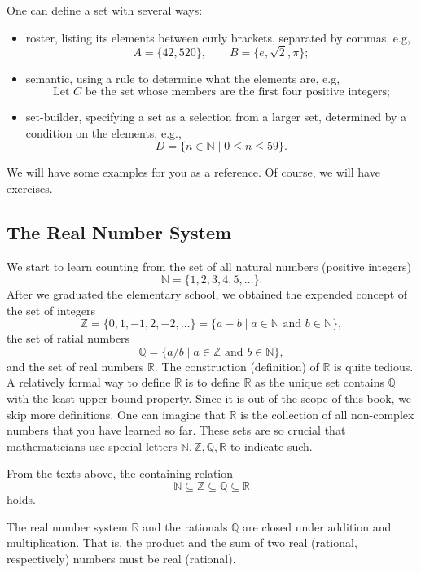 \documentclass[11pt]{book}
\theoremstyle{break}
\theoremstyle{no_label}
\newcommand{\bbR}{\mathbb{R}}
\newcommand{\bbN}{\mathbb{N}}
\numberwithin{equation}{section}
\begin{document}
One can define a set with several ways:
\begin{itemize}
    \item roster, listing its elements between curly brackets, separated by commas, e.g, $$A=\{42, 520\}, \qquad B=\{e, \sqrt{2}, \pi\};$$
    \item semantic, using a rule to determine what the elements are, e.g, $$\text{Let $C$ be the set whose members are the first four positive integers;}$$
    \item set-builder, specifying a set as a selection from a larger set, determined by a condition on the elements, e.g., $$D=\{n\in\bbN\mid 0\leq n\leq 59\}.$$
\end{itemize}

We will have some examples for you as a reference. Of course, we will have exercises.

\subsection*{The Real Number System}

We start to learn counting from the set of all natural numbers (positive integers) $$\bbN=\{1, 2, 3, 4, 5, \dots\}.$$ After we graduated the elementary school, we obtained the expended concept of the set of integers $$\mathbb{Z}=\{0, 1, -1, 2, -2, \dots\}=\{a - b\mid a\in\bbN\text{\ and \ }b\in\bbN\},$$ the set of ratial numbers $$\mathbb{Q}=\{a/b\mid a\in\mathbb{Z}\text{\ and\ }b\in\bbN\},$$ and the set of real numbers $\bbR$. The construction (definition) of $\bbR$ is quite tedious. A relatively formal way to define $\bbR$ is to define $\bbR$ as the unique set contains $\mathbb{Q}$ with the least upper bound property. Since it is out of the scope of this book, we skip more definitions. One can imagine that $\bbR$ is the collection of all non-complex numbers that you have learned so far. These sets are so crucial that mathematicians use special letters $\mathbb{N}, \mathbb{Z}, \mathbb{Q}, \bbR$ to indicate such.

\begin{corollary}
    From the texts above, the containing relation $$\bbN\subseteq\mathbb{Z}\subseteq\mathbb{Q}\subseteq\bbR$$ holds.
\end{corollary}

\begin{proposition} The real number system $\bbR$ and the rationals $\mathbb{Q}$ are closed under addition and multiplication. That is, the product and the sum of two real (rational, respectively) numbers must be real (rational).
\end{proposition}
\end{document}
